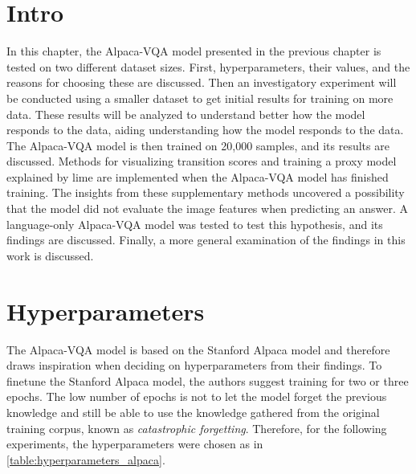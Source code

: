 \label{4_investigatory_experiments}

\section{Intro}

In this chapter, the Alpaca-VQA model presented in the previous chapter is tested on two different dataset sizes. First, hyperparameters, their values, and the reasons for choosing these are discussed. Then an investigatory experiment will be conducted using a smaller dataset to get initial results for training on more data. 
These results will be analyzed to understand better how the model responds to the data, aiding understanding how the model responds to the data.
The Alpaca-VQA model is then trained on 20,000 samples, and its results are discussed. Methods for visualizing transition scores and training a proxy model explained by \gls{lime} are implemented when the Alpaca-VQA model has finished training. 
The insights from these supplementary methods uncovered a possibility that the model did not evaluate the image features when predicting an answer. A language-only Alpaca-VQA model was tested to test this hypothesis, and its findings are discussed. 
Finally, a more general examination of the findings in this work is discussed. 

\section{Hyperparameters}
    The Alpaca-VQA model is based on the Stanford Alpaca model and therefore draws inspiration when deciding on hyperparameters from their findings.
    To finetune the Stanford Alpaca model, the authors suggest training for two or three epochs. The low number of epochs is not to let the model forget the previous knowledge and still be able to use the knowledge gathered from the original training corpus, known as \textit{catastrophic forgetting}. Therefore, for the following experiments, the hyperparameters were chosen as in \autoref{table:hyperparameters_alpaca}. 
    
